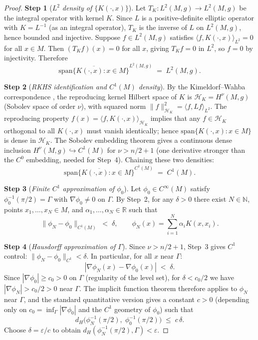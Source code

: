 \documentclass[11pt, a4paper]{article}
\theoremstyle{plain}
\theoremstyle{definition}
\begin{document}
\begin{proof}
\textbf{Step 1} (\emph{$L^2$ density of $\{K(\cdot,x)\}$}). \;
Let $T_K\colon L^2(M,g) \to L^2(M,g)$ be the integral operator with kernel $K$.
Since $L$ is a positive-definite elliptic operator with $K = L^{-1}$ (as an integral
operator), $T_K$ is the inverse of $L$ on $L^2(M,g)$, hence bounded and injective.
Suppose $f \in L^2(M,g)$ satisfies $\langle f, K(\cdot,x)\rangle_{L^2} = 0$ for all
$x \in M$.  Then $(T_K f)(x) = 0$ for all $x$, giving $T_K f = 0$ in $L^2$, so
$f = 0$ by injectivity.  Therefore
\[
  \overline{\mathrm{span}\{K(\cdot,x) : x \in M\}}^{L^2(M,g)} \;=\; L^2(M,g).
\]

\textbf{Step 2} (\emph{RKHS identification and $C^1(M)$ density}). \;
By the Kimeldorf--Wahba correspondence \cite{kimeldorf1971some}, the reproducing
kernel Hilbert space of $K$ is $\mathcal{H}_K = H^\nu(M,g)$ (Sobolev space of
order $\nu$), with squared norm $\|f\|_{\mathcal{H}_K}^2 = \langle f, Lf\rangle_{L^2}$.
The reproducing property $f(x) = \langle f, K(\cdot,x)\rangle_{\mathcal{H}_K}$
implies that any $f \in \mathcal{H}_K$ orthogonal to all $K(\cdot,x)$ must vanish
identically; hence $\mathrm{span}\{K(\cdot,x) : x \in M\}$ is dense in
$\mathcal{H}_K$.  The Sobolev embedding theorem \cite{sobolev1938} gives a
continuous dense inclusion $H^\nu(M,g) \hookrightarrow C^1(M)$ for $\nu > n/2+1$
(one derivative stronger than the $C^0$ embedding, needed for Step~4).
Chaining these two densities:
\[
  \overline{\mathrm{span}\{K(\cdot,x) : x \in M\}}^{C^1(M)} \;=\; C^1(M).
\]

\textbf{Step 3} (\emph{Finite $C^1$ approximation of $\phi_0$}). \;
Let $\phi_0 \in C^\infty(M)$ satisfy $\phi_0^{-1}(\pi/2) = \Gamma$ with
$\nabla\phi_0 \neq 0$ on $\Gamma$.  By Step~2, for any $\delta > 0$ there exist
$N \in \mathbb{N}$, points $x_1,\ldots,x_N \in M$, and $\alpha_1,\ldots,\alpha_N
\in \mathbb{R}$ such that
\[
  \|\phi_N - \phi_0\|_{C^1(M)} \;<\; \delta,
  \qquad \phi_N(x) = \sum_{i=1}^N \alpha_i K(x, x_i).
\]

\textbf{Step 4} (\emph{Hausdorff approximation of $\Gamma$}). \;
Since $\nu > n/2+1$, Step~3 gives $C^1$ control: $\|\phi_N - \phi_0\|_{C^1} < \delta$.
In particular, for all $x$ near $\Gamma$:
\[
  |\nabla\phi_N(x) - \nabla\phi_0(x)| \;<\; \delta.
\]
Since $|\nabla\phi_0| \geq c_0 > 0$ on $\Gamma$ (regularity of the level set), for
$\delta < c_0/2$ we have $|\nabla\phi_N| > c_0/2 > 0$ near $\Gamma$. The implicit
function theorem therefore applies to $\phi_N$ near $\Gamma$, and the standard
quantitative version gives a constant $c > 0$ (depending only on $c_0 =
\inf_\Gamma|\nabla\phi_0|$ and the $C^1$ geometry of $\phi_0$) such that
\[
  d_H\!\bigl(\phi_N^{-1}(\pi/2),\;\phi_0^{-1}(\pi/2)\bigr)
  \;\leq\; c\,\delta.
\]
Choose $\delta = \varepsilon/c$ to obtain $d_H(\phi_N^{-1}(\pi/2), \Gamma) <
\varepsilon$.


\end{proof}
\end{document}
